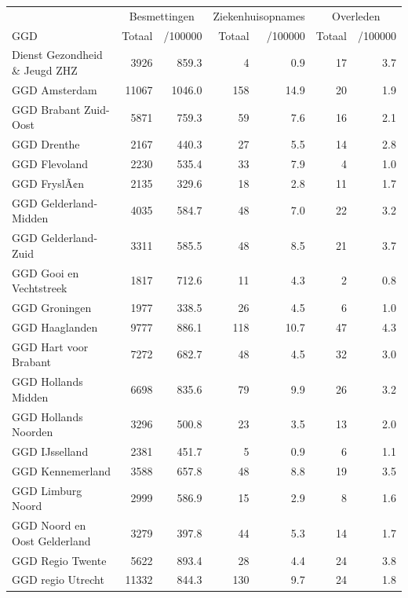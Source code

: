 \documentclass[
  english,
  man,floatsintext]{apa6}
\begin{document}
\begin{table}[H]
\centering\begingroup\fontsize{10}{12}\selectfont

\begin{threeparttable}
\begin{tabular}{lrrrrrr}
\toprule
\multicolumn{1}{c}{ } & \multicolumn{2}{c}{Besmettingen} & \multicolumn{2}{c}{Ziekenhuisopnames} & \multicolumn{2}{c}{Overleden} \\
\cmidrule(l{3pt}r{3pt}){2-3} \cmidrule(l{3pt}r{3pt}){4-5} \cmidrule(l{3pt}r{3pt}){6-7}
GGD & Totaal & /100000 & Totaal & /100000 & Totaal & /100000\\
\midrule
Dienst Gezondheid \& Jeugd ZHZ & 3926 & 859.3 & 4 & 0.9 & 17 & 3.7\\
GGD Amsterdam & 11067 & 1046.0 & 158 & 14.9 & 20 & 1.9\\
GGD Brabant Zuid-Oost & 5871 & 759.3 & 59 & 7.6 & 16 & 2.1\\
GGD Drenthe & 2167 & 440.3 & 27 & 5.5 & 14 & 2.8\\
GGD Flevoland & 2230 & 535.4 & 33 & 7.9 & 4 & 1.0\\
GGD FryslÃ¢n & 2135 & 329.6 & 18 & 2.8 & 11 & 1.7\\
GGD Gelderland-Midden & 4035 & 584.7 & 48 & 7.0 & 22 & 3.2\\
GGD Gelderland-Zuid & 3311 & 585.5 & 48 & 8.5 & 21 & 3.7\\
GGD Gooi en Vechtstreek & 1817 & 712.6 & 11 & 4.3 & 2 & 0.8\\
GGD Groningen & 1977 & 338.5 & 26 & 4.5 & 6 & 1.0\\
GGD Haaglanden & 9777 & 886.1 & 118 & 10.7 & 47 & 4.3\\
GGD Hart voor Brabant & 7272 & 682.7 & 48 & 4.5 & 32 & 3.0\\
GGD Hollands Midden & 6698 & 835.6 & 79 & 9.9 & 26 & 3.2\\
GGD Hollands Noorden & 3296 & 500.8 & 23 & 3.5 & 13 & 2.0\\
GGD IJsselland & 2381 & 451.7 & 5 & 0.9 & 6 & 1.1\\
GGD Kennemerland & 3588 & 657.8 & 48 & 8.8 & 19 & 3.5\\
GGD Limburg Noord & 2999 & 586.9 & 15 & 2.9 & 8 & 1.6\\
GGD Noord en Oost Gelderland & 3279 & 397.8 & 44 & 5.3 & 14 & 1.7\\
GGD Regio Twente & 5622 & 893.4 & 28 & 4.4 & 24 & 3.8\\
GGD regio Utrecht & 11332 & 844.3 & 130 & 9.7 & 24 & 1.8\\

\end{tabular}
\end{threeparttable}
\end{table}
\end{document}
